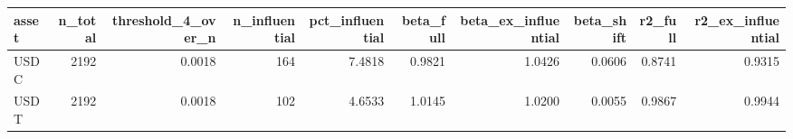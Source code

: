 \begin{tabular}{lrrrrrrrrr}
\toprule
asset & n_total & threshold_4_over_n & n_influential & pct_influential & beta_full & beta_ex_influential & beta_shift & r2_full & r2_ex_influential \\
\midrule
USDC & 2192 & 0.0018 & 164 & 7.4818 & 0.9821 & 1.0426 & 0.0606 & 0.8741 & 0.9315 \\
USDT & 2192 & 0.0018 & 102 & 4.6533 & 1.0145 & 1.0200 & 0.0055 & 0.9867 & 0.9944 \\
\bottomrule
\end{tabular}
